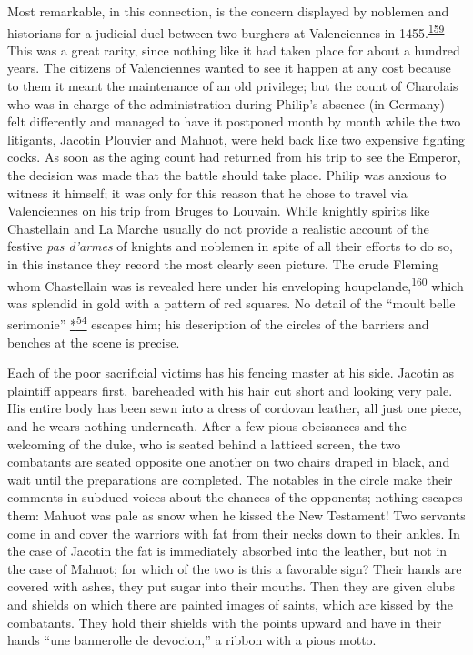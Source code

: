 Most remarkable, in this connection, is the concern displayed by
noblemen and historians for a judicial duel between two burghers at
Valenciennes in
1455.\textsuperscript{\protect\hypertarget{10_Chapter_Three__THE_HEROIC_DREAM.xhtmlux5cux23id_1618}{\protect\hyperlink{23_NOTES.xhtmlux5cux23id_1619}{159}}}
This was a great rarity, since nothing like it had taken place for about
a hundred years. The citizens of Valenciennes wanted to see it happen at
any cost because to them it meant the maintenance of an old privilege;
but the count of Charolais who was in charge of the administration
during Philip's absence (in Germany) felt differently and managed to
have it postponed month by month while the two litigants, Jacotin
Plouvier and Mahuot, were held back like two expensive fighting cocks.
As soon as the aging count had returned from his trip to see the
Emperor, the decision was made that the battle should take place. Philip
was anxious to witness it himself; it was only for this reason that he
chose to travel via Valenciennes on his trip from Bruges to Louvain.
While knightly spirits like Chastellain and La Marche usually do not
provide a realistic account of the festive \emph{pas d'armes} of knights
and noblemen in spite of all their efforts to do so, in this instance
they record the most clearly seen picture. The crude
Flem\protect\hypertarget{10_Chapter_Three__THE_HEROIC_DREAM.xhtmlux5cux23page_110}{}{}ing
whom Chastellain was is revealed here under his enveloping
houpelande,\textsuperscript{\protect\hypertarget{10_Chapter_Three__THE_HEROIC_DREAM.xhtmlux5cux23id_1616}{\protect\hyperlink{23_NOTES.xhtmlux5cux23id_1617}{160}}}
which was splendid in gold with a pattern of red squares. No detail of
the ``moult belle serimonie''
\protect\hypertarget{10_Chapter_Three__THE_HEROIC_DREAM.xhtmlux5cux23id_2895}{\protect\hyperlink{23_NOTES.xhtmlux5cux23id_2896}{*\textsuperscript{54}}}
escapes him; his description of the circles of the barriers and benches
at the scene is precise.

Each of the poor sacrificial victims has his fencing master at his side.
Jacotin as plaintiff appears first, bareheaded with his hair cut short
and looking very pale. His entire body has been sewn into a dress of
cordovan leather, all just one piece, and he wears nothing underneath.
After a few pious obeisances and the welcoming of the duke, who is
seated behind a latticed screen, the two combatants are seated opposite
one another on two chairs draped in black, and wait until the
preparations are completed. The notables in the circle make their
comments in subdued voices about the chances of the opponents; nothing
escapes them: Mahuot was pale as snow when he kissed the New Testament!
Two servants come in and cover the warriors with fat from their necks
down to their ankles. In the case of Jacotin the fat is immediately
absorbed into the leather, but not in the case of Mahuot; for which of
the two is this a favorable sign? Their hands are covered with ashes,
they put sugar into their mouths. Then they are given clubs and shields
on which there are painted images of saints, which are kissed by the
combatants. They hold their shields with the points upward and have in
their hands ``une bannerolle de devocion,'' a ribbon with a pious motto.

